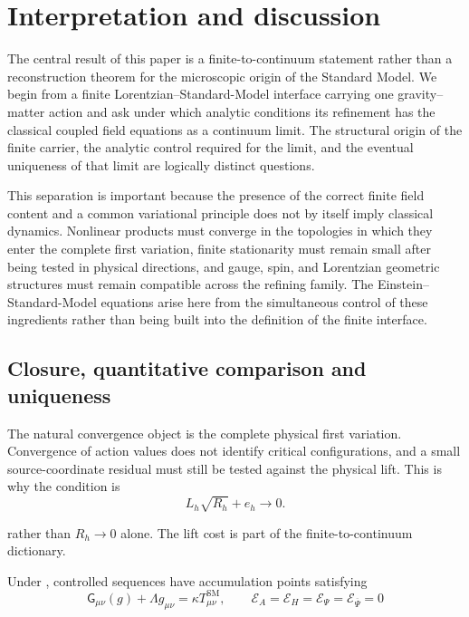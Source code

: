 \documentclass[11pt]{article}
\numberwithin{equation}{section}
\theoremstyle{definition}
\theoremstyle{remark}
\newcommand{\Eins}{\mathsf G}
\newcommand{\Evar}{\mathcal E}
\newcommand{\bPsi}{\overline\Psi}
\begin{document}
\section{Interpretation and discussion}
\label{sec:discussion}

The central result of this paper is a finite-to-continuum statement rather
than a reconstruction theorem for the microscopic origin of the Standard
Model.  We begin from a finite Lorentzian--Standard-Model interface carrying
one gravity--matter action and ask under which analytic conditions its
refinement has the classical coupled field equations as a continuum limit.
The structural origin of the finite carrier, the analytic control required
for the limit, and the eventual uniqueness of that limit are logically
distinct questions.

This separation is important because the presence of the correct finite
field content and a common variational principle does not by itself imply
classical dynamics.  Nonlinear products must converge in the topologies in
which they enter the complete first variation, finite stationarity must remain
small after being tested in physical directions, and gauge, spin, and
Lorentzian geometric structures must remain compatible across the refining
family.  The Einstein--Standard-Model equations arise here from the
simultaneous control of these ingredients rather than being built into the
definition of the finite interface.

\subsection{Closure, quantitative comparison and uniqueness}

The natural convergence object is the complete physical first variation.
Convergence of action values does not identify critical configurations, and
a small source-coordinate residual must still be tested against the
physical lift. This is why the condition is
\begin{equation}
L_h\sqrt{R_h}+e_h\longrightarrow0.
\label{eq:discussion-scaled-stationarity}
\end{equation}

rather than $R_h\to0$ alone. The lift cost is part of the
finite-to-continuum dictionary.

Under , controlled sequences have accumulation
points satisfying
\begin{equation}
\Eins_{\mu\nu}(g)+\Lambda g_{\mu\nu}
=
\kappa T^{\mathrm{SM}}_{\mu\nu},
\qquad
\Evar_A=\Evar_H=\Evar_\Psi=\Evar_{\bPsi}=0
\label{eq:discussion-ESM}
\end{equation}
\end{document}
